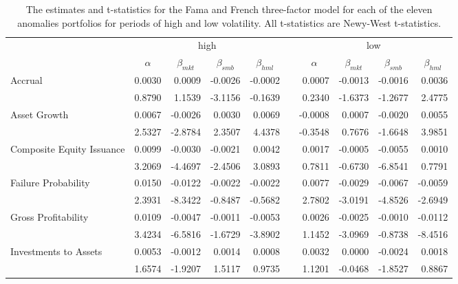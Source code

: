 \begin{table}[h]
    \caption{\newline The estimates and t-statistics for the Fama and French three-factor model for each of the eleven anomalies portfolios for periods of high and low volatility.  All t-statistics are Newy-West t-statistics.}
      \begin{tabular}{lrrrrlrrrr}
      \toprule
            & \multicolumn{4}{c}{high}      &       & \multicolumn{4}{c}{low} \\
  \cmidrule{2-5}\cmidrule{7-10}          & \multicolumn{1}{c}{$\alpha$} & \multicolumn{1}{c}{$\beta_{mkt}$} & \multicolumn{1}{c}{$\beta_{smb}$} & \multicolumn{1}{c}{$\beta_{hml}$} &       & \multicolumn{1}{c}{$\alpha$} & \multicolumn{1}{c}{$\beta_{mkt}$} & \multicolumn{1}{c}{$\beta_{smb}$} & \multicolumn{1}{c}{$\beta_{hml}$} \\
      \midrule
      Accrual & 0.0030 & 0.0009 & -0.0026 & -0.0002 &       & 0.0007 & -0.0013 & -0.0016 & 0.0036 \\
            & 0.8790 & 1.1539 & -3.1156 & -0.1639 &       & 0.2340 & -1.6373 & -1.2677 & 2.4775 \\
      Asset Growth & 0.0067 & -0.0026 & 0.0030 & 0.0069 &       & -0.0008 & 0.0007 & -0.0020 & 0.0055 \\
            & 2.5327 & -2.8784 & 2.3507 & 4.4378 &       & -0.3548 & 0.7676 & -1.6648 & 3.9851 \\
      Composite Equity Issuance & 0.0099 & -0.0030 & -0.0021 & 0.0042 &       & 0.0017 & -0.0005 & -0.0055 & 0.0010 \\
            & 3.2069 & -4.4697 & -2.4506 & 3.0893 &       & 0.7811 & -0.6730 & -6.8541 & 0.7791 \\
      Failure Probability & 0.0150 & -0.0122 & -0.0022 & -0.0022 &       & 0.0077 & -0.0029 & -0.0067 & -0.0059 \\
            & 2.3931 & -8.3422 & -0.8487 & -0.5682 &       & 2.7802 & -3.0191 & -4.8526 & -2.6949 \\
      Gross Profitability & 0.0109 & -0.0047 & -0.0011 & -0.0053 &       & 0.0026 & -0.0025 & -0.0010 & -0.0112 \\
            & 3.4234 & -6.5816 & -1.6729 & -3.8902 &       & 1.1452 & -3.0969 & -0.8738 & -8.4516 \\
      Investments to Assets & 0.0053 & -0.0012 & 0.0014 & 0.0008 &       & 0.0032 & 0.0000 & -0.0024 & 0.0018 \\
            & 1.6574 & -1.9207 & 1.5117 & 0.9735 &       & 1.1201 & -0.0468 & -1.8527 & 0.8867 \\

\end{tabular}
\end{table}
